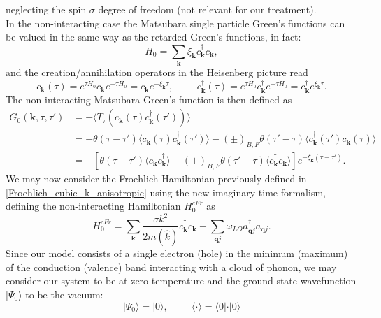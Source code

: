 \documentclass[12pt, a4paper]{report}
\numberwithin{equation}{section}
\begin{document}
neglecting the spin $\sigma$ degree of freedom (not relevant for our treatment).\\
In the non-interacting case the Matsubara single particle Green's functions can be valued in the same way as the retarded Green's functions, 
in fact:
\begin{equation}
    H_0=\sum_{\mathbf{k}}\xi_\mathbf{k}c^\dagger_\mathbf{k}c_\mathbf{k},
\end{equation}
and the creation/annihilation operators in the Heisenberg picture read
\begin{equation}
    c_\mathbf{k}(\tau)=e^{\tau H_0}c_\mathbf{k}e^{-\tau H_0}=c_\mathbf{k}e^{-\xi_\mathbf{k}\tau},\hspace{1cm}c^\dagger_\mathbf{k}(\tau)=e^{\tau H_0}c^\dagger_\mathbf{k}e^{-\tau H_0}=c^\dagger_\mathbf{k}e^{\xi_\mathbf{k}\tau}.
\end{equation}
The non-interacting Matsubara Green's function is then defined as 
\begin{equation}
\begin{split}
    G_0(\mathbf{k},\tau,\tau')&=-\langle T_\tau\left(c_\mathbf{k}(\tau)c^\dagger_\mathbf{k}(\tau')\right)\rangle\\
    &=-\theta(\tau-\tau')\langle c_\mathbf{k}(\tau)c^\dagger_\mathbf{k}(\tau')\rangle-(\pm)_{B,F}\theta(\tau'-\tau)\langle c^\dagger_\mathbf{k}(\tau')c_\mathbf{k}(\tau)\rangle\\
    &=-\left[\theta(\tau-\tau')\langle c_\mathbf{k}c^\dagger_\mathbf{k}\rangle-(\pm)_{B,F}\theta(\tau'-\tau)\langle c_\mathbf{k}^\dagger c_\mathbf{k}\rangle\right]e^{-\xi_\mathbf{k}(\tau-\tau')}.
    \label{free_propagator}
\end{split}
\end{equation}
We may now consider the Froehlich Hamiltonian previously defined in \ref{Froehlich_cubic_k_anisotropic} using the new imaginary time formalism,
defining the non-interacting Hamiltonian $H^{cFr}_0$ as 
\begin{equation}
    H^{cFr}_0=\sum_\mathbf{k}\frac{\sigma k^2}{2m(\hat{k})}c^\dagger_{\mathbf{k}}c_\mathbf{k}+\sum_{\mathbf{q}j}\omega_{LO}a^\dagger_{\mathbf{q}j}a_{\mathbf{q}j}.
    \label{polaron_non-interacting}
\end{equation}
Since our model consists of a single electron (hole) in the minimum (maximum) of the conduction (valence) band interacting with a cloud of phonon, we may 
consider our system to be at zero temperature and the ground state wavefunction $|\Psi_0\rangle$ to be the vacuum:
\begin{equation}
    |\Psi_0\rangle=|0\rangle,\hspace{1cm}\langle \cdot \rangle=\langle 0|\cdot|0\rangle
\end{equation}
\end{document}
